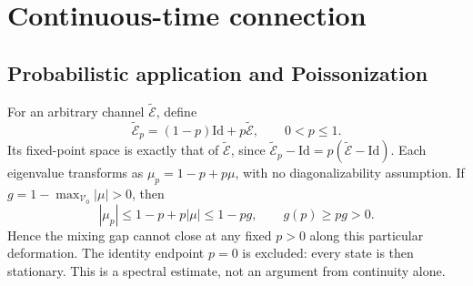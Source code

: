 \documentclass[aps,prb,onecolumn,nofootinbib,superscriptaddress,floatfix]{revtex4-2}
\newcommand{\E}{\widetilde{\mathcal E}}
\begin{document}
\section{Continuous-time connection}
\label{sec:continuous}
\subsection{Probabilistic application and Poissonization}
For an arbitrary channel $\E$, define
\begin{equation}
 \E_p=(1-p)\mathrm{Id}+p\E,\qquad 0<p\le1. \label{eq:lazy}
\end{equation}
Its fixed-point space is exactly that of $\E$, since
$\E_p-\mathrm{Id}=p(\E-\mathrm{Id})$. Each eigenvalue transforms
as $\mu_p=1-p+p\mu$, with no diagonalizability assumption.
If $g=1-\max_{\mathcal V_0}|\mu|>0$, then
\begin{equation}
 |\mu_p|\le1-p+p|\mu|\le1-pg,\qquad
 \boxed{g(p)\ge pg>0.} \label{eq:lazy_bound}
\end{equation}
Hence the mixing gap cannot close at any fixed $p>0$ along this
particular deformation. The identity endpoint $p=0$ is excluded:
every state is then stationary. This is a spectral estimate, not
an argument from continuity alone.
\end{document}

